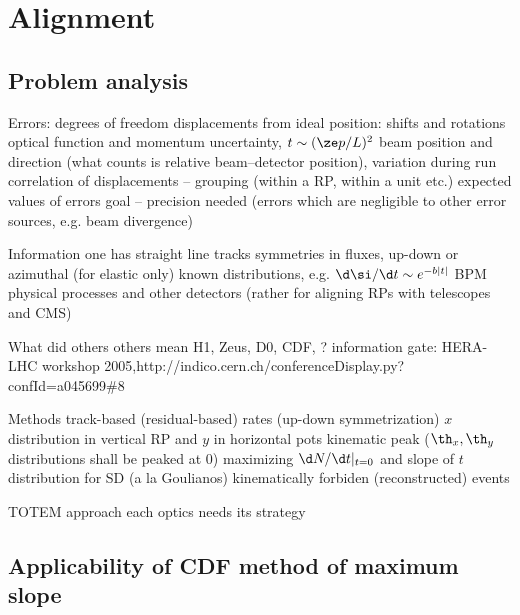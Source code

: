 \vfil\eject


\chapter{Alignment}

\section{Problem analysis}

\bitm
\itm Errors: degrees of freedom
\itmm displacements from ideal position: shifts and rotations 
\itmm optical function and momentum uncertainty, $t\sim (\ze p/L)^2$
\itmm beam position and direction (what counts is relative beam--detector position), variation during run
\itmm correlation of displacements -- grouping (within a RP, within a unit etc.)
\itmm expected values of errors
\itmm goal -- precision needed (errors which are negligible to other error sources, e.g. beam divergence)


\itm Information one has
\itmm straight line tracks
\itmm symmetries in fluxes, up-down or azimuthal (for elastic only)
\itmm known distributions, e.g. $\d\si/\d t \sim e^{-b|t|}$
\itmm BPM
\itmm physical processes and other detectors (rather for aligning RPs with telescopes and CMS)


\itm What did others
\itmm others mean H1, Zeus, D0, CDF, ?
\itmm information gate: HERA-LHC workshop 2005,\hfil\break http://indico.cern.ch/conferenceDisplay.py?confId=a045699\#8

\itm Methods
\itmm track-based (residual-based)
\itmm rates (up-down symmetrization)
\itmm $x$ distribution in vertical RP and $y$ in horizontal pots
\itmm kinematic peak ($\th_x, \th_y$ distributions shall be peaked at $0$)
\itmm maximizing $\d N/\d t|_{t=0}$ and slope of $t$ distribution for SD (a la Goulianos)
\itmm kinematically forbiden (reconstructed) events

\itm TOTEM approach
\itmm each optics needs its strategy

\eitm

\section{Applicability of CDF method of maximum slope}

